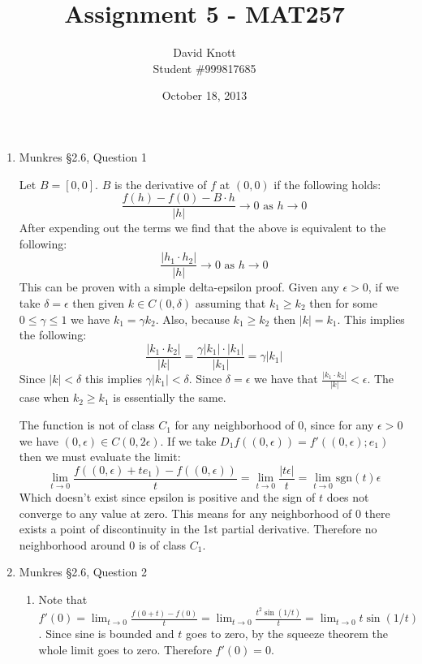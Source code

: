 \documentclass[letterpaper,10pt]{article}
\begin{document}
\title{Assignment 5 - MAT257}
\author{David Knott \\  Student \#999817685}
\date{October 18, 2013}
\maketitle
\begin{enumerate}
	\item Munkres \S 2.6, Question 1

	Let $B = [0, 0]$. $B$ is the derivative of $f$ at $(0, 0)$ if the following holds:
	$$ \frac{f(h) - f(0) - B \cdot h}{|h|} \to 0 \text{ as } h \to 0$$
	After expending out the terms we find that the above is equivalent to the following:
	$$ \frac{|h_1 \cdot h_2|}{|h|} \to 0 \text{ as } h \to 0$$
	This can be proven with a simple delta-epsilon proof. Given any $\epsilon > 0$, if we take $\delta = \epsilon$ then given $k \in C(0, \delta)$ assuming that $k_1 \geq k_2$ then for some $0 \leq \gamma \leq 1$ we have $k_1 = \gamma k_2$. Also, because $k_1 \geq k_2$ then $|k| = k_1$. This implies the following:
	$$\frac{|k_1 \cdot k_2 |}{|k|} = \frac {\gamma|k_1| \cdot |k_1|}{|k_1|} = \gamma|k_1|$$
	Since $|k| < \delta$ this implies $\gamma|k_1| < \delta$. Since $\delta = \epsilon$ we have that $\frac{|k_1 \cdot k_2 |}{|k|} < \epsilon$. The case when $k_2 \geq k_1$ is essentially the same.

	The function is not of class $C_1$ for any neighborhood of $0$, since for any $\epsilon > 0$ we have $(0, \epsilon) \in C(0, 2\epsilon)$. If we take $D_1 f((0, \epsilon)) = f'((0, \epsilon); e_1)$ then we must evaluate the limit:
	$$ \lim_{t \to 0} \frac{f((0, \epsilon) + te_1) - f((0, \epsilon))}{t} = \lim_{t \to 0} \frac{|t\epsilon|}{t} = \lim_{t \to 0} \text{sgn}(t) \epsilon$$
	Which doesn't exist since epsilon is positive and the sign of $t$ does not converge to any value at zero. This means for any neighborhood of $0$ there exists a point of discontinuity in the 1st partial derivative. Therefore no neighborhood around $0$ is of class $C_1$.

	\item Munkres \S 2.6, Question 2

	\begin{enumerate}
		\item Note that $f'(0) = \lim_{t \to 0} \frac{f(0+t) - f(0)}{t} = \lim_{t \to 0} \frac{t^2 \sin(1/t)}{t} = \lim_{t \to 0} t \sin(1/t)$. Since sine is bounded and $t$ goes to zero, by the squeeze theorem the whole limit goes to zero. Therefore $f'(0) = 0$.


\end{enumerate}
\end{enumerate}
\end{document}
